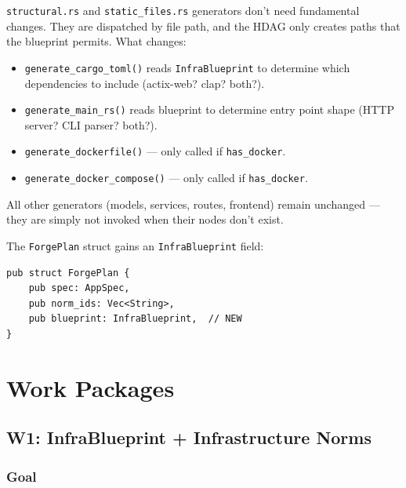 \documentclass[11pt,a4paper]{article}
\begin{document}
\texttt{structural.rs} and \texttt{static\_files.rs} generators don't 
need fundamental changes. They are dispatched by file path, and the HDAG 
only creates paths that the blueprint permits. What changes:

\begin{itemize}[nosep]
\item \texttt{generate\_cargo\_toml()} reads \texttt{InfraBlueprint} 
      to determine which dependencies to include (actix-web? clap? both?).
\item \texttt{generate\_main\_rs()} reads blueprint to determine entry 
      point shape (HTTP server? CLI parser? both?).
\item \texttt{generate\_dockerfile()} --- only called if 
      \texttt{has\_docker}.
\item \texttt{generate\_docker\_compose()} --- only called if 
      \texttt{has\_docker}.
\end{itemize}

All other generators (models, services, routes, frontend) remain 
unchanged --- they are simply not invoked when their nodes don't exist.

The \texttt{ForgePlan} struct gains an \texttt{InfraBlueprint} field:

\begin{lstlisting}[style=rust]
pub struct ForgePlan {
    pub spec: AppSpec,
    pub norm_ids: Vec<String>,
    pub blueprint: InfraBlueprint,  // NEW
}
\end{lstlisting}


\section{Work Packages}

\subsection{W1: InfraBlueprint + Infrastructure Norms}
\label{sec:w1}

\subsubsection{Goal}
\end{document}
